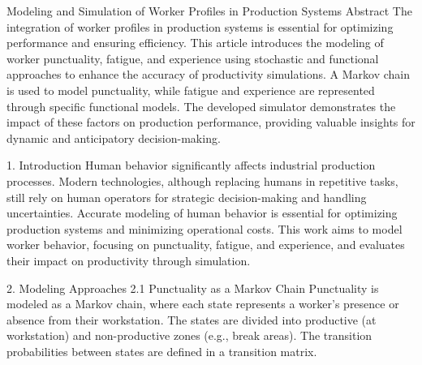 
Modeling and Simulation of Worker Profiles in Production Systems
Abstract
The integration of worker profiles in production systems is essential for optimizing performance and ensuring efficiency. This article introduces the modeling of worker punctuality, fatigue, and experience using stochastic and functional approaches to enhance the accuracy of productivity simulations. A Markov chain is used to model punctuality, while fatigue and experience are represented through specific functional models. The developed simulator demonstrates the impact of these factors on production performance, providing valuable insights for dynamic and anticipatory decision-making.

1. Introduction
Human behavior significantly affects industrial production processes. Modern technologies, although replacing humans in repetitive tasks, still rely on human operators for strategic decision-making and handling uncertainties. Accurate modeling of human behavior is essential for optimizing production systems and minimizing operational costs. This work aims to model worker behavior, focusing on punctuality, fatigue, and experience, and evaluates their impact on productivity through simulation.

2. Modeling Approaches
2.1 Punctuality as a Markov Chain
Punctuality is modeled as a Markov chain, where each state represents a worker's presence or absence from their workstation. The states are divided into productive (at workstation) and non-productive zones (e.g., break areas). The transition probabilities between states are defined in a transition matrix.


